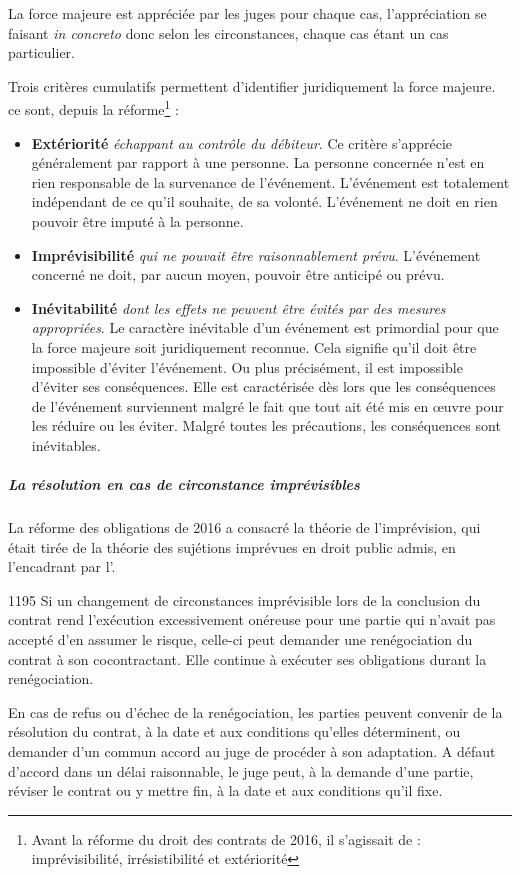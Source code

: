 						La force majeure est appréciée par les juges pour chaque cas, l’appréciation se faisant \emph{in concreto} donc selon les circonstances, chaque cas étant un cas particulier.

						Trois critères cumulatifs permettent d'identifier juridiquement la force majeure. ce sont, depuis la réforme\footnote{Avant la réforme du droit des contrats de 2016, il s'agissait de : imprévisibilité, irrésistibilité et extériorité} :
						\begin{itemize}
							\item \textbf{Extériorité} \emph{échappant au contrôle du débiteur}. Ce critère s’apprécie généralement par rapport à une personne. La personne concernée n’est en rien responsable de la survenance de l’événement. L’événement est totalement indépendant de ce qu’il souhaite, de sa volonté. L’événement ne doit en rien pouvoir être imputé à la personne.

							\item \textbf{Imprévisibilité} \emph{qui ne pouvait être raisonnablement prévu}. L’événement concerné ne doit, par aucun moyen, pouvoir être anticipé ou prévu.

							\item \textbf{Inévitabilité} \emph{dont les effets ne peuvent être évités par des mesures appropriées}. Le caractère inévitable d’un événement est primordial pour que la force majeure soit juridiquement reconnue. Cela signifie qu’il doit être impossible d’éviter l'événement. Ou plus précisément, il est impossible d’éviter ses conséquences. Elle est caractérisée dès lors que les conséquences de l’événement surviennent malgré le fait que tout ait été mis en œuvre pour les réduire ou les éviter. Malgré toutes les précautions, les conséquences sont inévitables.
						\end{itemize}

					\subparagraph{La résolution en cas de circonstance imprévisibles}

						La réforme des obligations de 2016 a consacré la théorie de l’imprévision, qui était tirée de la théorie des sujétions imprévues en droit public admis, en l'encadrant par
l'.

						\begin{citationArticleCciv}{1195}
							Si un changement de circonstances imprévisible lors de la conclusion du contrat rend l'exécution excessivement onéreuse pour une partie qui n'avait pas accepté d'en assumer le risque, celle-ci peut demander une renégociation du contrat à son cocontractant. Elle continue à exécuter ses obligations durant la renégociation.

							En cas de refus ou d'échec de la renégociation, les parties peuvent convenir de la résolution du contrat, à la date et aux conditions qu'elles déterminent, ou demander d'un commun accord au juge de procéder à son adaptation. A défaut d'accord dans un délai raisonnable, le juge peut, à la demande d'une partie, réviser le contrat ou y mettre fin, à la date et aux conditions qu'il fixe.
						\end{citationArticleCciv}

